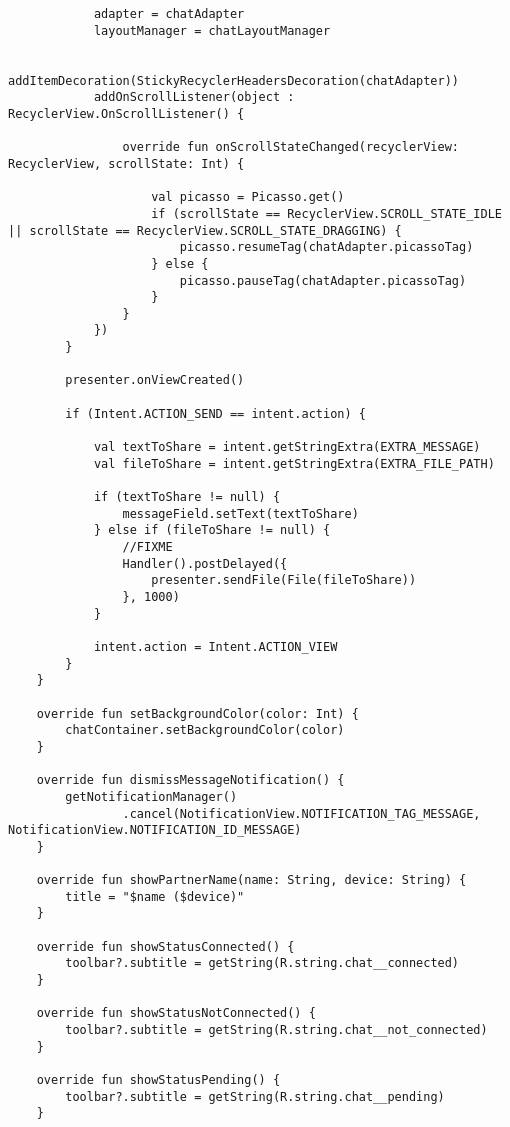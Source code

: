 \begin{lstlisting}
            adapter = chatAdapter
            layoutManager = chatLayoutManager

            addItemDecoration(StickyRecyclerHeadersDecoration(chatAdapter))
            addOnScrollListener(object : RecyclerView.OnScrollListener() {

                override fun onScrollStateChanged(recyclerView: RecyclerView, scrollState: Int) {

                    val picasso = Picasso.get()
                    if (scrollState == RecyclerView.SCROLL_STATE_IDLE || scrollState == RecyclerView.SCROLL_STATE_DRAGGING) {
                        picasso.resumeTag(chatAdapter.picassoTag)
                    } else {
                        picasso.pauseTag(chatAdapter.picassoTag)
                    }
                }
            })
        }

        presenter.onViewCreated()

        if (Intent.ACTION_SEND == intent.action) {

            val textToShare = intent.getStringExtra(EXTRA_MESSAGE)
            val fileToShare = intent.getStringExtra(EXTRA_FILE_PATH)

            if (textToShare != null) {
                messageField.setText(textToShare)
            } else if (fileToShare != null) {
                //FIXME
                Handler().postDelayed({
                    presenter.sendFile(File(fileToShare))
                }, 1000)
            }

            intent.action = Intent.ACTION_VIEW
        }
    }

    override fun setBackgroundColor(color: Int) {
        chatContainer.setBackgroundColor(color)
    }

    override fun dismissMessageNotification() {
        getNotificationManager()
                .cancel(NotificationView.NOTIFICATION_TAG_MESSAGE, NotificationView.NOTIFICATION_ID_MESSAGE)
    }

    override fun showPartnerName(name: String, device: String) {
        title = "$name ($device)"
    }

    override fun showStatusConnected() {
        toolbar?.subtitle = getString(R.string.chat__connected)
    }

    override fun showStatusNotConnected() {
        toolbar?.subtitle = getString(R.string.chat__not_connected)
    }

    override fun showStatusPending() {
        toolbar?.subtitle = getString(R.string.chat__pending)
    }


\end{lstlisting}
